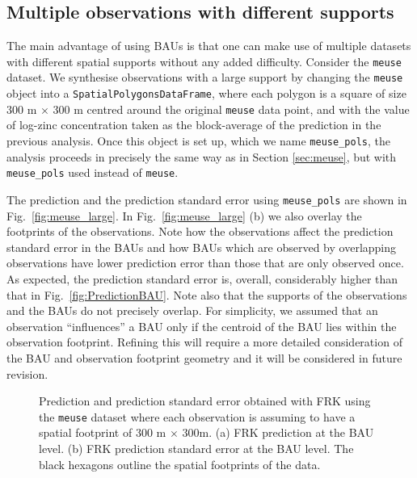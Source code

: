 \documentclass{article}\usepackage[]{graphicx}\usepackage[]{color}
\newenvironment{knitrout}{}{} %
\renewcommand{\tt} {\texttt}
\begin{document}
\subsection{Multiple observations with different supports}

The main advantage of using BAUs is that one can make use of multiple datasets with different spatial supports without any added difficulty. Consider the \tt{meuse} dataset. We synthesise observations with a large support by changing the \tt{meuse} object into a \tt{SpatialPolygonsDataFrame}, where each polygon is a square of size 300 m $\times$ 300 m centred around the original \tt{meuse} data point, and with the value of log-zinc concentration taken as the block-average of the prediction in the previous analysis. Once this object is set up, which we name \tt{meuse\_pols}, the analysis proceeds in precisely the same way as in Section \ref{sec:meuse}, but with \tt{meuse\_pols} used instead of \tt{meuse}.

The prediction and the prediction standard error using \tt{meuse\_pols} are shown in Fig.~\ref{fig:meuse_large}. In Fig.~\ref{fig:meuse_large} (b) we also overlay the footprints of the observations. Note how the observations affect the prediction standard error in the BAUs and how BAUs which are observed by overlapping observations have lower prediction error than those that are only observed once. As expected, the prediction standard error is, overall, considerably higher than that in Fig.~\ref{fig:PredictionBAU}. Note also that the supports of the observations and the BAUs do not precisely overlap. For simplicity, we assumed that an observation ``influences'' a BAU only if the centroid of the BAU lies within the observation footprint. Refining this will require a more detailed consideration of the BAU and observation footprint geometry and it will be considered in future revision.







\begin{knitrout}
\color{fgcolor}\begin{figure}[t]
\caption{Prediction and prediction standard error obtained with FRK using the \tt{meuse} dataset where each observation is assuming to have a spatial footprint of 300 m $\times$ 300m. (a) FRK prediction at the BAU level. (b) FRK prediction standard error at the BAU level. The black hexagons outline the spatial footprints of the data.\label{fig:meuse_large}}\label{fig:unnamed-chunk-65}
\end{figure}


\end{knitrout}
\end{document}
